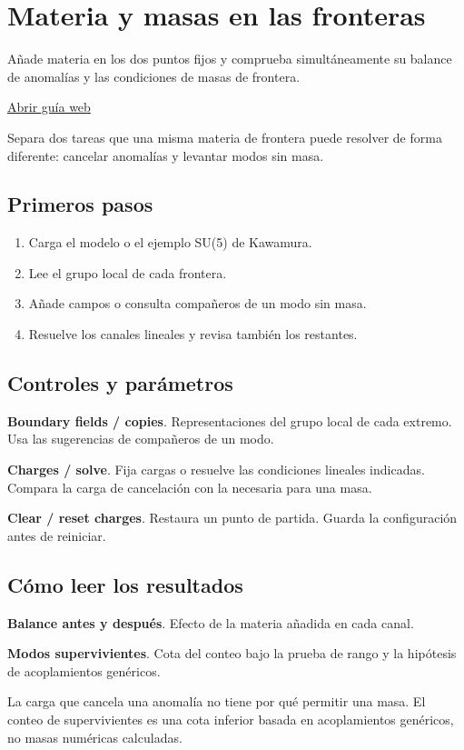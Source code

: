\documentclass[11pt,a4paper]{article}
\begin{document}
\section{Materia y masas en las fronteras}
Añade materia en los dos puntos fijos y comprueba simultáneamente su balance de anomalías y las condiciones de masas de frontera.

\href{https://karlesmarin.github.io/ghu-explorer/guide/es/brane/index.html}{Abrir guía web}

Separa dos tareas que una misma materia de frontera puede resolver de forma diferente: cancelar anomalías y levantar modos sin masa.
\subsection*{Primeros pasos}
\begin{enumerate}
\item Carga el modelo o el ejemplo SU(5) de Kawamura.
\item Lee el grupo local de cada frontera.
\item Añade campos o consulta compañeros de un modo sin masa.
\item Resuelve los canales lineales y revisa también los restantes.
\end{enumerate}
\subsection*{Controles y parámetros}
\textbf{Boundary fields / copies}. Representaciones del grupo local de cada extremo. Usa las sugerencias de compañeros de un modo.

\textbf{Charges / solve}. Fija cargas o resuelve las condiciones lineales indicadas. Compara la carga de cancelación con la necesaria para una masa.

\textbf{Clear / reset charges}. Restaura un punto de partida. Guarda la configuración antes de reiniciar.

\subsection*{Cómo leer los resultados}
\textbf{Balance antes y después}. Efecto de la materia añadida en cada canal.

\textbf{Modos supervivientes}. Cota del conteo bajo la prueba de rango y la hipótesis de acoplamientos genéricos.

La carga que cancela una anomalía no tiene por qué permitir una masa. El conteo de supervivientes es una cota inferior basada en acoplamientos genéricos, no masas numéricas calculadas.
\end{document}
